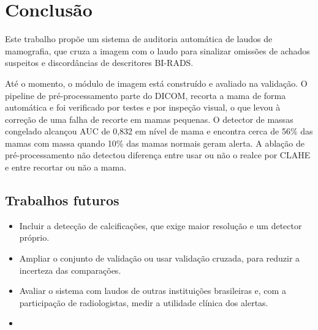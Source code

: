 \chapter{Conclusão}\label{cap:conclusao}

Este trabalho propõe um sistema de auditoria automática de laudos de mamografia, que cruza a imagem com o laudo para sinalizar omissões de achados suspeitos e discordâncias de descritores BI-RADS.

Até o momento, o módulo de imagem está construído e avaliado na validação. O pipeline de pré-processamento parte do DICOM, recorta a mama de forma automática e foi verificado por testes e por inspeção visual, o que levou à correção de uma falha de recorte em mamas pequenas. O detector de massas congelado alcançou AUC de 0,832 em nível de mama e encontra cerca de 56\% das mamas com massa quando 10\% das mamas normais geram alerta. A ablação de pré-processamento não detectou diferença entre usar ou não o realce por CLAHE e entre recortar ou não a mama.


\section{Trabalhos futuros}

\begin{itemize}
  \item Incluir a detecção de calcificações, que exige maior resolução e um detector próprio.
  \item Ampliar o conjunto de validação ou usar validação cruzada, para reduzir a incerteza das comparações.
  \item Avaliar o sistema com laudos de outras instituições brasileiras e, com a participação de radiologistas, medir a utilidade clínica dos alertas.
  \item {}
\end{itemize}
